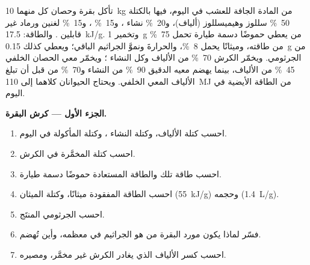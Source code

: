 \begin{problem}
\label{pb:b1:digestion-absorption:1}
تأكل بقرة وحصان كل منهما \qty{10}{kg} من المادة الجافة للعشب في
اليوم، فيها بالكتلة \qty{50}{\%} سللوز وهيميسللوز (ألياف)،
و\qty{20}{\%} نشاء ، و\qty{15}{\%} ، و\qty{15}{\%}
لغنين ورماد غير قابلين . والطاقة:  
\qty{17.5}{kJ/g}. وتخمير \qty{1}{g} من  يعطي حموضًا
دسمة طيارة تحمل \qty{75}{\%} من طاقته، وميثانًا يحمل
\qty{8}{\%}، والحرارةَ ونموَّ الجراثيم الباقي؛ ويعطي كذلك
\qty{0.15}{g} من  الجرثومي. ويخمّر الكرش \qty{70}{\%} من
الألياف وكل النشاء ؛ ويخمّر معي الحصان الخلفي \qty{45}{\%}
من الألياف، بينما يهضم معيه الدقيق \qty{90}{\%} من النشاء
و\qty{70}{\%} من  قبل أن تبلغ الألياف المعي الخلفي.
ويحتاج الحيوانان كلاهما إلى \qty{110}{MJ} من الطاقة الأيضية في
اليوم.

\medskip
\noindent\textbf{الجزء الأول --- كرش البقرة.}
\begin{enumerate}
  \item احسب كتلة الألياف، وكتلة النشاء ، وكتلة 
        المأكولة في اليوم.
  \item احسب كتلة  المخمَّرة في الكرش.
  \item احسب طاقة تلك  والطاقة المستعادة حموضًا دسمة
        طيارة.
  \item احسب الطاقة المفقودة ميثانًا، وكتلة الميثان
        (\qty{55}{kJ/g}) وحجمه (\qty{1.4}{L/g}).
  \item احسب  الجرثومي المنتَج.
  \item فسّر لماذا يكون مورد البقرة من  هو الجراثيم في
        معظمه، وأين تُهضم.
  \item احسب كسر الألياف الذي يغادر الكرش غير مخمَّر، ومصيره.
\end{enumerate}


\end{problem}
